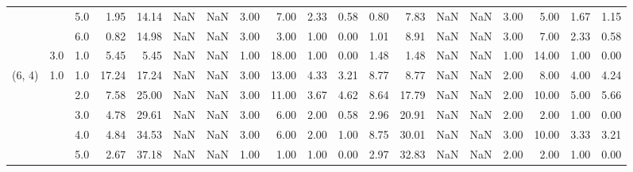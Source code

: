\begin{tabular}{lllrrrrrrrrrrrrrrrr}
       &     & 5.0  &      1.95 &      14.14 &               NaN &                NaN &  3.00 &   7.00 &             2.33 &                         0.58 &      0.80 &       7.83 &               NaN &                NaN & 3.00 &   5.00 &             1.67 &                         1.15 \\
       &     & 6.0  &      0.82 &      14.98 &               NaN &                NaN &  3.00 &   3.00 &             1.00 &                         0.00 &      1.01 &       8.91 &               NaN &                NaN & 3.00 &   7.00 &             2.33 &                         0.58 \\
       & 3.0 & 1.0  &      5.45 &       5.45 &               NaN &                NaN &  1.00 &  18.00 &             1.00 &                         0.00 &      1.48 &       1.48 &               NaN &                NaN & 1.00 &  14.00 &             1.00 &                         0.00 \\
(6, 4) & 1.0 & 1.0  &     17.24 &      17.24 &               NaN &                NaN &  3.00 &  13.00 &             4.33 &                         3.21 &      8.77 &       8.77 &               NaN &                NaN & 2.00 &   8.00 &             4.00 &                         4.24 \\
       &     & 2.0  &      7.58 &      25.00 &               NaN &                NaN &  3.00 &  11.00 &             3.67 &                         4.62 &      8.64 &      17.79 &               NaN &                NaN & 2.00 &  10.00 &             5.00 &                         5.66 \\
       &     & 3.0  &      4.78 &      29.61 &               NaN &                NaN &  3.00 &   6.00 &             2.00 &                         0.58 &      2.96 &      20.91 &               NaN &                NaN & 2.00 &   2.00 &             1.00 &                         0.00 \\
       &     & 4.0  &      4.84 &      34.53 &               NaN &                NaN &  3.00 &   6.00 &             2.00 &                         1.00 &      8.75 &      30.01 &               NaN &                NaN & 3.00 &  10.00 &             3.33 &                         3.21 \\
       &     & 5.0  &      2.67 &      37.18 &               NaN &                NaN &  1.00 &   1.00 &             1.00 &                         0.00 &      2.97 &      32.83 &               NaN &                NaN & 2.00 &   2.00 &             1.00 &                         0.00 \\

\end{tabular}
